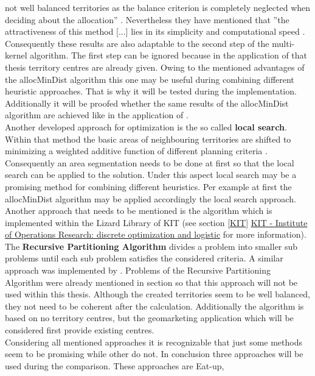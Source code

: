 not well balanced territories as the balance criterion is completely neglected when deciding about the allocation'' \cite{kalcsics2}. Nevertheless they have mentioned that ''the attractiveness of this method [...] lies in its simplicity and computational speed \cite{kalcsics2}. Consequently these results are also adaptable to the second step of the multi-kernel algorithm. The first step can be ignored because in the application of that thesis territory centres are already given. Owing to the mentioned advantages of the allocMinDist algorithm this one may be useful during combining different heuristic approaches. That is why it will be tested during the implementation. Additionally it will be proofed whether the same results of the allocMinDist algorithm are achieved like in the application of \citeauthor{kalcsics2}. \\
Another developed approach for optimization is the so called \textbf{local search}. Within that method the basic areas of neighbouring territories are shifted to minimizing a weighted additive function of different planning criteria \cite{kalcsics}. Consequently an area segmentation needs to be done at first so that the local search can be applied to the solution. Under this aspect local search may be a promising method for combining different heuristics. Per example at first the allocMinDist algorithm may be applied accordingly the local search approach. \\
Another approach that needs to be mentioned is the algorithm which is implemented within the Lizard Library of KIT (see section \ref{KIT} \hyperref[KIT]{KIT - Institute of Operations Research: discrete optimization and logistic} for more information). The \textbf{Recursive Partitioning Algorithm} divides a problem into smaller sub problems until each sub problem satisfies the considered criteria. A similar approach was implemented by \citeauthor{forrest} \cite{forrest}. Problems of the Recursive Partitioning Algorithm were already mentioned in section \label{KIT} so that this approach will not be used within this thesis. Although the created territories seem to be well balanced, they not need to be coherent after the calculation. Additionally the algorithm is based on no territory centres, but the geomarketing application which will be considered first provide existing centres. \\
Considering all mentioned approaches it is recognizable that just some methods seem to be promising while other do not. In conclusion three approaches will be used during the comparison. These approaches are Eat-up,
